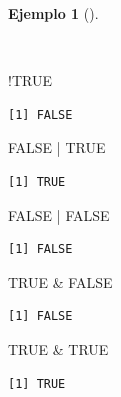 \documentclass[
  spanish,
  a4paper,
]{scrreport}
\newenvironment{Shaded}{\begin{snugshade}}{\end{snugshade}}
\newcommand{\ConstantTok}[1]{\textcolor[rgb]{0.56,0.35,0.01}{#1}}
\newcommand{\SpecialCharTok}[1]{\textcolor[rgb]{0.37,0.37,0.37}{#1}}
\theoremstyle{definition}
\theoremstyle{definition}
\newtheorem{example}{Ejemplo}[chapter]
\theoremstyle{remark}
\begin{document}
\begin{example}[]\protect\hypertarget{exm-operadores-logicos}{}\label{exm-operadores-logicos}

~

\begin{Shaded}
\begin{Highlighting}[]
\SpecialCharTok{!}\ConstantTok{TRUE}
\end{Highlighting}
\end{Shaded}

\begin{verbatim}
[1] FALSE
\end{verbatim}

\begin{Shaded}
\begin{Highlighting}[]
\ConstantTok{FALSE} \SpecialCharTok{|} \ConstantTok{TRUE}
\end{Highlighting}
\end{Shaded}

\begin{verbatim}
[1] TRUE
\end{verbatim}

\begin{Shaded}
\begin{Highlighting}[]
\ConstantTok{FALSE} \SpecialCharTok{|} \ConstantTok{FALSE}
\end{Highlighting}
\end{Shaded}

\begin{verbatim}
[1] FALSE
\end{verbatim}

\begin{Shaded}
\begin{Highlighting}[]
\ConstantTok{TRUE} \SpecialCharTok{\&} \ConstantTok{FALSE}
\end{Highlighting}
\end{Shaded}

\begin{verbatim}
[1] FALSE
\end{verbatim}

\begin{Shaded}
\begin{Highlighting}[]
\ConstantTok{TRUE} \SpecialCharTok{\&} \ConstantTok{TRUE}
\end{Highlighting}
\end{Shaded}

\begin{verbatim}
[1] TRUE
\end{verbatim}

\end{example}
\end{document}
